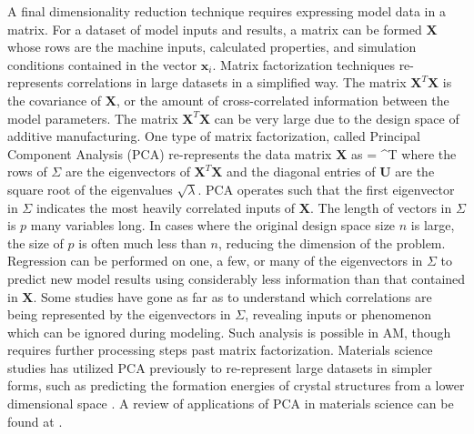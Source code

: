 A final dimensionality reduction technique requires expressing model data in a matrix. For a dataset of model inputs and results, a matrix can be formed $\mathbf{X}$ whose rows are the machine inputs, calculated properties, and simulation conditions contained in the vector $\mathbf{x}_i$. Matrix factorization techniques re-represents correlations in large datasets in a simplified way. The matrix $\mathbf{X}^T\mathbf{X}$ is the covariance of $\mathbf{X}$, or the amount of cross-correlated information between the model parameters. The matrix $\mathbf{X}^T\mathbf{X}$ can be very large due to the design space of additive manufacturing. One type of matrix factorization, called Principal Component Analysis (PCA) re-represents the data matrix $\mathbf{X}$ as
\eqn
	 =  \mathbf{\Sigma}^T
	\label{PCA}
\equ
where the rows of $\Sigma$ are the eigenvectors of $\mathbf{X}^T\mathbf{X}$ and the diagonal entries of $\mathbf{U}$ are the square root of the eigenvalues $\sqrt{\lambda}$. PCA operates such that the first eigenvector in $\Sigma$ indicates the most heavily correlated inputs of $\mathbf{X}$. The length of vectors in $\Sigma$ is $p$ many variables long. In cases where the original design space size $n$ is large, the size of $p$ is often much less than $n$, reducing the dimension of the problem. Regression can be performed on one, a few, or many of the eigenvectors in $\Sigma$ to predict new model results using considerably less information than that contained in $\mathbf{X}$. Some studies have gone as far as to understand which correlations are being represented by the eigenvectors in $\Sigma$, revealing inputs or phenomenon which can be ignored during modeling. Such analysis is possible in AM, though requires further processing steps past matrix factorization. Materials science studies has utilized PCA previously to re-represent large datasets in simpler forms, such as predicting the formation energies of crystal structures from a lower dimensional space \cite{Curtarolo2003}. A review of applications of PCA in materials science can be found at \cite{Rajan2009}.
